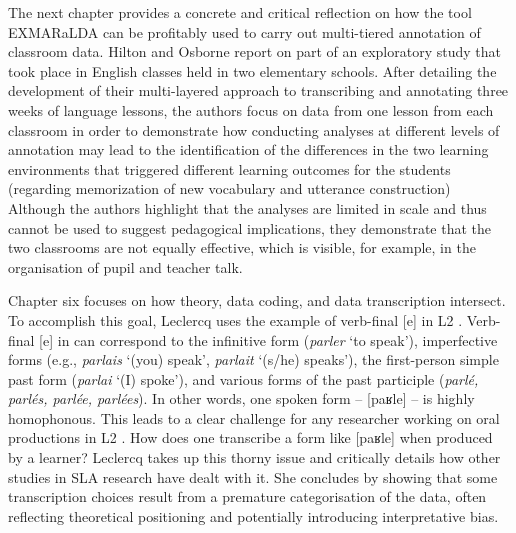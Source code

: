 \documentclass[output=paper]{../langscibook}
\begin{document}
The next chapter provides a concrete and critical reflection on how the tool EXMARaLDA can be profitably used to carry out multi-tiered annotation of classroom data. Hilton and Osborne report on part of an exploratory study that took place in English classes held in two  elementary schools. After detailing the development of their multi-layered approach to transcribing and annotating three weeks of language lessons, the authors focus on data from one lesson from each classroom in order to demonstrate how conducting analyses at different levels of annotation may lead to the identification of the differences in the two learning environments that triggered different learning outcomes for the students (regarding memorization of new vocabulary and utterance construction) Although the authors highlight that the analyses are limited in scale and thus cannot be used to suggest pedagogical implications, they demonstrate that the two classrooms are not equally effective, which is visible, for example, in the organisation of pupil and teacher talk.

Chapter six focuses on how theory, data coding, and data transcription intersect. To accomplish this goal, Leclercq uses the example of verb-final [e] in L2 . Verb-final [e] in  can correspond to the infinitive form (\textit{parler} ‘to speak’), imperfective forms (e.g., \textit{parlais} ‘(you) speak’, \textit{parlait} ‘(s/he) speaks’), the first-person simple past form (\textit{parlai} ‘(I) spoke’), and various forms of the past participle (\textit{parlé, parlés, parlée, parlées}). In other words, one spoken form – [p{aʁle}] – is highly homophonous. This leads to a clear challenge for any researcher working on oral productions in L2 . How does one transcribe a form like [p{aʁle}] when produced by a learner? Leclercq takes up this thorny issue and critically details how other studies in SLA research have dealt with it. She concludes by showing that some transcription choices result from a premature categorisation of the data, often reflecting theoretical positioning and potentially introducing interpretative bias.
\end{document}
